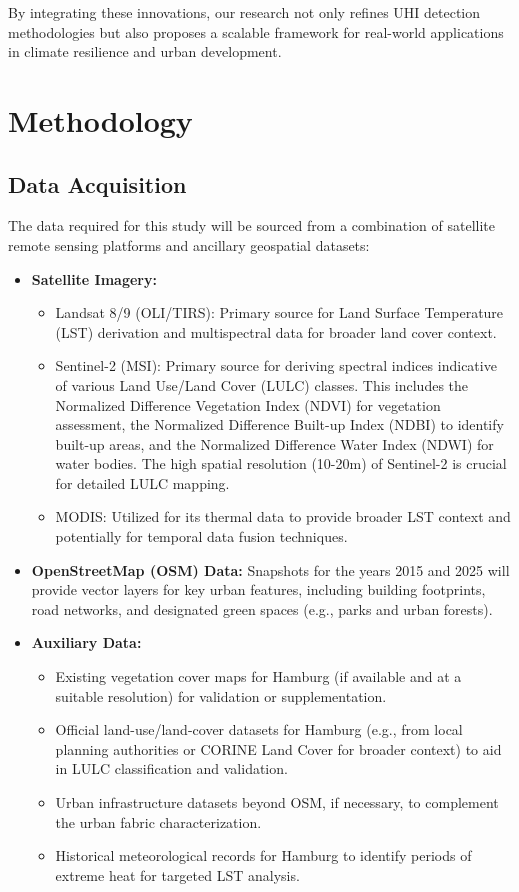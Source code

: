 \documentclass{article}
\begin{document}
By integrating these innovations, our research not only refines UHI detection methodologies but also proposes a scalable framework for real-world applications in climate resilience and urban development.

\section{Methodology}

\subsection{Data Acquisition}
The data required for this study will be sourced from a combination of satellite remote sensing platforms and ancillary geospatial datasets:
\begin{itemize}
    \item \textbf{Satellite Imagery:}
        \begin{itemize}
            \item Landsat 8/9 (OLI/TIRS): Primary source for Land Surface Temperature (LST) derivation and multispectral data for broader land cover context.
            \item Sentinel-2 (MSI): Primary source for deriving spectral indices indicative of various Land Use/Land Cover (LULC) classes. This includes the Normalized Difference Vegetation Index (NDVI) for vegetation assessment, the Normalized Difference Built-up Index (NDBI) to identify built-up areas, and the Normalized Difference Water Index (NDWI) for water bodies. The high spatial resolution (10-20m) of Sentinel-2 is crucial for detailed LULC mapping.
            \item MODIS: Utilized for its thermal data to provide broader LST context and potentially for temporal data fusion techniques.
        \end{itemize}
    \item \textbf{OpenStreetMap (OSM) Data:} Snapshots for the years 2015 and 2025 will provide vector layers for key urban features, including building footprints, road networks, and designated green spaces (e.g., parks and urban forests).
    \item \textbf{Auxiliary Data:}
        \begin{itemize}
            \item Existing vegetation cover maps for Hamburg (if available and at a suitable resolution) for validation or supplementation.
            \item Official land-use/land-cover datasets for Hamburg (e.g., from local planning authorities or CORINE Land Cover for broader context) to aid in LULC classification and validation.
            \item Urban infrastructure datasets beyond OSM, if necessary, to complement the urban fabric characterization.
            \item Historical meteorological records for Hamburg to identify periods of extreme heat for targeted LST analysis.
        \end{itemize}
\end{itemize}
\end{document}
